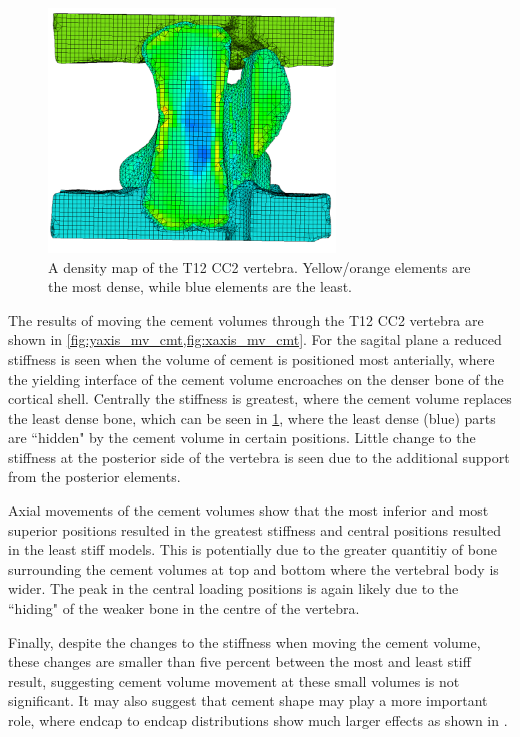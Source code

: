 \begin{figure}[ht!]

\centering
\includegraphics[width=3in]{images/mv_cmt_image.png}
	\caption{A density map of the T12 CC2 vertebra. Yellow/orange elements are the most dense, while blue elements are the least. }
	\label{fig:mv_cmt_image}
\end{figure}

The results of moving the cement volumes through the T12 CC2 vertebra are shown
in \cref{fig:yaxis_mv_cmt,fig:xaxis_mv_cmt}.  For the sagital plane a reduced
stiffness is seen when the volume of cement is positioned most anterially,
where the yielding interface of the cement volume encroaches on the denser bone
of the cortical shell.  Centrally the stiffness is greatest, where the cement
volume replaces the least dense bone, which can be seen in
\cref{fig:mv_cmt_image}, where the least dense (blue) parts are ``hidden" by
the cement volume in certain positions.  Little change to the stiffness at the
posterior side of the vertebra is seen due to the additional support from the
posterior elements.

Axial movements of the cement volumes show that the most inferior and most
superior positions resulted in the greatest stiffness and central positions
resulted in the least stiff models.  This is potentially due to the greater
quantitiy of bone surrounding the cement volumes at top and bottom where the
vertebral body is wider.  The peak in the central loading positions is again likely
due to the ``hiding" of the weaker bone in the centre of the vertebra.

Finally, despite the changes to the stiffness when moving the cement volume,
these changes are smaller than five percent between the most and least stiff
result, suggesting cement volume movement at these small volumes is not
significant.  It may also suggest that cement shape may play a more important
role, where endcap to endcap distributions show much larger effects as shown in
\cite{aquarius2014prophylactic, steens2007influence, Chevalier2008}.

